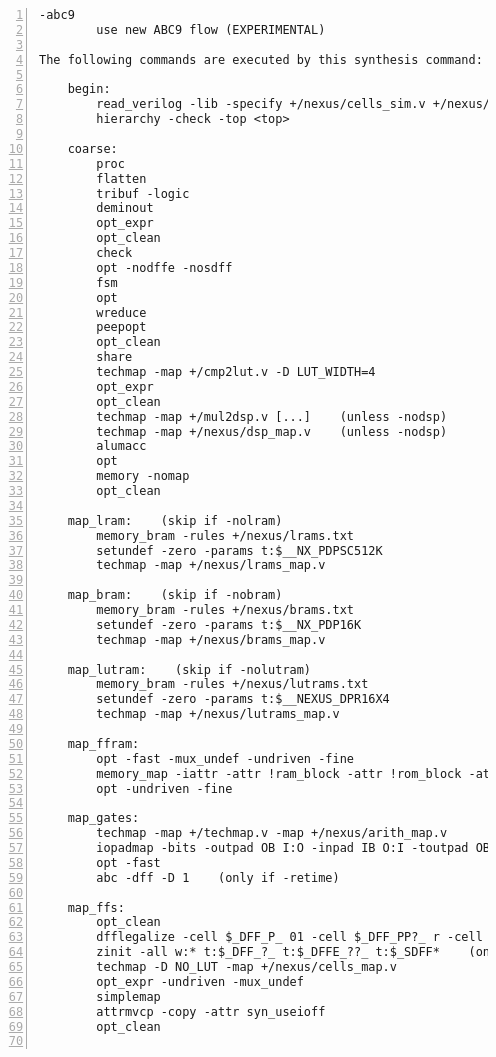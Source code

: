 \begin{lstlisting}[numbers=left,frame=single]
    -abc9
        use new ABC9 flow (EXPERIMENTAL)

The following commands are executed by this synthesis command:

    begin:
        read_verilog -lib -specify +/nexus/cells_sim.v +/nexus/cells_xtra.v
        hierarchy -check -top <top>

    coarse:
        proc
        flatten
        tribuf -logic
        deminout
        opt_expr
        opt_clean
        check
        opt -nodffe -nosdff
        fsm
        opt
        wreduce
        peepopt
        opt_clean
        share
        techmap -map +/cmp2lut.v -D LUT_WIDTH=4
        opt_expr
        opt_clean
        techmap -map +/mul2dsp.v [...]    (unless -nodsp)
        techmap -map +/nexus/dsp_map.v    (unless -nodsp)
        alumacc
        opt
        memory -nomap
        opt_clean

    map_lram:    (skip if -nolram)
        memory_bram -rules +/nexus/lrams.txt
        setundef -zero -params t:$__NX_PDPSC512K
        techmap -map +/nexus/lrams_map.v

    map_bram:    (skip if -nobram)
        memory_bram -rules +/nexus/brams.txt
        setundef -zero -params t:$__NX_PDP16K
        techmap -map +/nexus/brams_map.v

    map_lutram:    (skip if -nolutram)
        memory_bram -rules +/nexus/lutrams.txt
        setundef -zero -params t:$__NEXUS_DPR16X4
        techmap -map +/nexus/lutrams_map.v

    map_ffram:
        opt -fast -mux_undef -undriven -fine
        memory_map -iattr -attr !ram_block -attr !rom_block -attr logic_block -attr syn_ramstyle=auto -attr syn_ramstyle=registers -attr syn_romstyle=auto -attr syn_romstyle=logic
        opt -undriven -fine

    map_gates:
        techmap -map +/techmap.v -map +/nexus/arith_map.v
        iopadmap -bits -outpad OB I:O -inpad IB O:I -toutpad OBZ ~T:I:O -tinoutpad BB ~T:O:I:B A:top    (skip if '-noiopad')
        opt -fast
        abc -dff -D 1    (only if -retime)

    map_ffs:
        opt_clean
        dfflegalize -cell $_DFF_P_ 01 -cell $_DFF_PP?_ r -cell $_SDFF_PP?_ r -cell $_DLATCH_?_ x [-cell $_DFFE_PP_ 01 -cell $_DFFE_PP?P_ r -cell $_SDFFE_PP?P_ r]    ($_*DFFE_* only if not -nodffe)
        zinit -all w:* t:$_DFF_?_ t:$_DFFE_??_ t:$_SDFF*    (only if -abc9 and -dff
        techmap -D NO_LUT -map +/nexus/cells_map.v
        opt_expr -undriven -mux_undef
        simplemap
        attrmvcp -copy -attr syn_useioff
        opt_clean


\end{lstlisting}
